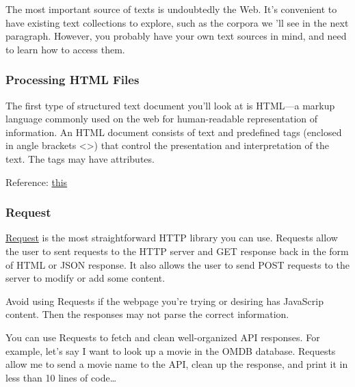 \documentclass[11pt]{article}
\begin{document}
    The most important source of texts is undoubtedly the Web. It's
convenient to have existing text collections to explore, such as the
corpora we 'll see in the next paragraph. However, you probably have
your own text sources in mind, and need to learn how to access them.

    \hypertarget{processing-html-files}{%
\subsubsection{Processing HTML Files}\label{processing-html-files}}

The first type of structured text document you'll look at is HTML---a
markup language commonly used on the web for human-readable
representation of information. An HTML document consists of text and
predefined tags (enclosed in angle brackets \textless\textgreater) that
control the presentation and interpretation of the text. The tags may
have attributes.

Reference:
\href{https://towardsdatascience.com/choose-the-best-python-web-scraping-library-for-your-application-91a68bc81c4f}{this}

    \hypertarget{request}{%
\subsubsection{Request}\label{request}}

\href{https://requests.readthedocs.io/en/master/}{Request} is the most
straightforward HTTP library you can use. Requests allow the user to
sent requests to the HTTP server and GET response back in the form of
HTML or JSON response. It also allows the user to send POST requests to
the server to modify or add some content.

    Avoid using Requests if the webpage you're trying or desiring has
JavaScrip content. Then the responses may not parse the correct
information.

You can use Requests to fetch and clean well-organized API responses.
For example, let's say I want to look up a movie in the OMDB database.
Requests allow me to send a movie name to the API, clean up the
response, and print it in less than 10 lines of code\ldots{}
\end{document}
